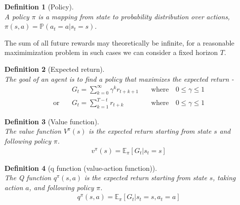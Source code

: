 \documentclass[11pt]{book} %
\newtheorem{definition}{Definition}[section]
\begin{document}
\begin {definition}[Policy]\ \\
    A policy $\pi$ is a mapping from state to probability distribution over actions, \\
    $\pi(s, a) = \mathbb{P}(a_t = a | s_t = s)$.

\end{definition}
The sum of all future rewards may theoretically be infinite, for a reasonable maximimization problem in such cases we can consider a fixed horizon $T$.

\begin {definition}[Expected return]\ \\
    The goal of an agent is to find a policy that maximizes the expected return -
    \begin{align*}
        &G_t = \sum_{k=0}^{\infty} \gamma^k r_{t+k+1} \quad &\text{where} \quad 0 \leq \gamma \leq 1 \\
        \text{or} \quad &G_t = \sum_{k=1}^{T-t}  r_{t+k} \quad &\text{where} \quad 0 \leq \gamma \leq 1
    \end{align*}
\end{definition}


\begin{definition}[Value function]\ \\
    The value function $V^{\pi}(s)$ is the expected return starting from state $s$ and following policy $\pi$.
    \begin{align*}
        v^{\pi}(s) = \mathbb{E}_{\pi} \left[ G_t | s_t = s \right]
    \end{align*}
\end{definition}


\begin{definition}[q function (value-action function)]\ \\
    The Q function $q^{\pi}(s, a)$ is the expected return starting from state $s$, taking action $a$, and following policy $\pi$.
    \begin{align*}
        q^{\pi}(s, a) = \mathbb{E}_{\pi} \left[ G_t | s_t = s, a_t = a \right]
    \end{align*}
\end{definition}
\end{document}
